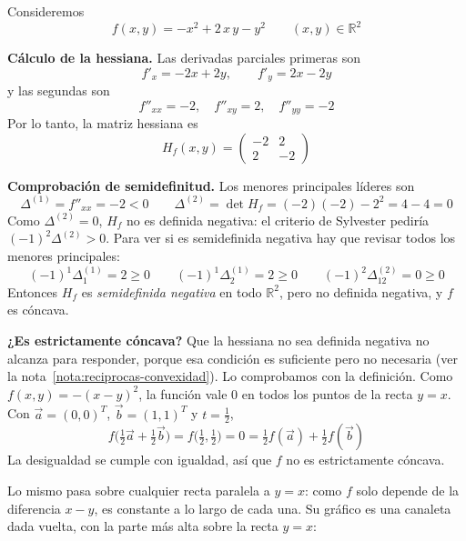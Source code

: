 \documentclass{article}
\newcommand{\R}{\ensuremath{\mathbb{R}}}
\newcommand{\vect}[1]{\vec{#1}}
\begin{document}
Consideremos
\[
f(x,y) = -x^2 + 2\,x\,y - y^2
\qquad (x,y)\in\R^2
\]

\medskip
\noindent\textbf{Cálculo de la hessiana.} Las derivadas parciales primeras son
\[
f'_x = -2x + 2y,\qquad f'_y = 2x - 2y
\]
y las segundas son
\[
f''_{xx} = -2,\quad
f''_{xy} = 2,\quad
f''_{yy} = -2
\]
Por lo tanto, la matriz hessiana es
\[
H_f(x,y) =
\begin{pmatrix}
-2 & 2\\[4pt]
2  & -2
\end{pmatrix}
\]

\medskip
\noindent\textbf{Comprobación de semidefinitud.} Los menores principales líderes son
\[
\Delta^{(1)} = f''_{xx} = -2 < 0
\qquad
\Delta^{(2)} = \det H_f = (-2)(-2) - 2^2 = 4 - 4 = 0
\]
Como \(\Delta^{(2)}=0\), \(H_f\) no es definida negativa: el criterio de Sylvester pediría \((-1)^2\Delta^{(2)}>0\). Para ver si es semidefinida negativa hay que revisar todos los menores principales:
\[
(-1)^1\Delta^{(1)}_1 = 2 \ge 0
\qquad
(-1)^1\Delta^{(1)}_2 = 2 \ge 0
\qquad
(-1)^2\Delta^{(2)}_{12} = 0 \ge 0
\]
Entonces \(H_f\) es \emph{semidefinida negativa} en todo \(\R^2\), pero no definida negativa, y \(f\) es cóncava.

\medskip
\noindent\textbf{¿Es estrictamente cóncava?} Que la hessiana no sea definida negativa no alcanza para responder, porque esa condición es suficiente pero no necesaria (ver la nota~\ref{nota:reciprocas-convexidad}). Lo comprobamos con la definición. Como \(f(x,y)=-(x-y)^2\), la función vale \(0\) en todos los puntos de la recta \(y=x\). Con \(\vect{a}=(0,0)^T\), \(\vect{b}=(1,1)^T\) y \(t=\tfrac12\),
\[
f\bigl(\tfrac12\vect{a}+\tfrac12\vect{b}\bigr)=f\bigl(\tfrac12,\tfrac12\bigr)=0=\tfrac12 f(\vect{a})+\tfrac12 f(\vect{b})
\]
La desigualdad se cumple con igualdad, así que \(f\) no es estrictamente cóncava.

Lo mismo pasa sobre cualquier recta paralela a \(y=x\): como \(f\) solo depende de la diferencia \(x-y\), es constante a lo largo de cada una. Su gráfico es una canaleta dada vuelta, con la parte más alta sobre la recta \(y=x\):
\end{document}
